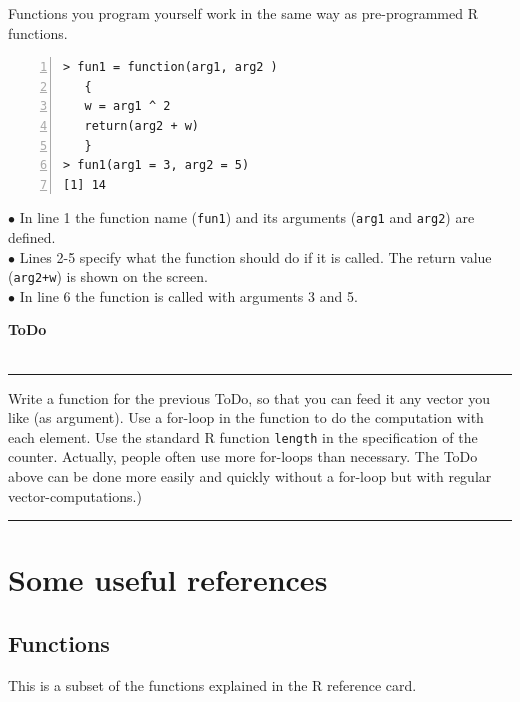 \documentclass[a4paper,11pt,twocolumn,tablecaptionabove]{scrartcl}
\makeatletter
\newenvironment{ToDo} {%
  \begin{flushright}
    \hfill
    \begin{minipage}{0.95\columnwidth}         %
    \textsf{\textbf{ToDo}} \\
      \vspace{-0.85cm}\\
      {\color{Gray}\rule[-0.1cm]{\columnwidth}{1.5pt}}} { %
      {\color{Gray} \rule[0.3cm]{\columnwidth}{1.5pt}}
    \end{minipage}
    \vspace{1em}
  \end{flushright}
  }
\let\SF@@footnote\footnote
\def\footnote{\ifx\protect\@typeset@protect
 \expandafter\SF@@footnote
 \else
 \expandafter\SF@gobble@opt
 \fi
}
\edef\SF@gobble@opt{\noexpand\protect
 \expandafter\noexpand\csname SF@gobble@opt \endcsname}
\makeatother
\begin{document}
Functions you program yourself work in the same way as pre-programmed R functions.

\begin{Verbatim}[frame=single,numbers=left,gobble=0, xleftmargin=0.35cm, numbersep=0.1cm]
> fun1 = function(arg1, arg2 )
   {
   w = arg1 ^ 2
   return(arg2 + w)
   }
> fun1(arg1 = 3, arg2 = 5) 
[1] 14

\end{Verbatim}

\noindent $\bullet$ In line 1 the function name (\texttt{fun1}) and its arguments (\texttt{arg1} and \texttt{arg2}) are defined. \\
\noindent $\bullet$ Lines 2-5 specify what the function should do if it is called. The return value (\texttt{arg2+w}) is shown on the screen. \\
\noindent $\bullet$ In line 6 the function is called with arguments 3 and 5.

\begin{ToDo}
Write a function for the previous ToDo, so that you can feed it any vector you like (as argument). Use a for-loop in the function to do the computation with each element. Use the standard R function \texttt{length} in the specification of the counter. \footnote{Actually, people often use more for-loops than necessary. The ToDo above can be done more easily and quickly without a for-loop but with regular vector-computations.})
\end{ToDo}

\newpage


\section{Some useful references}

\subsection{Functions}

This is a subset of the functions explained in the R reference card.\\
\end{document}
